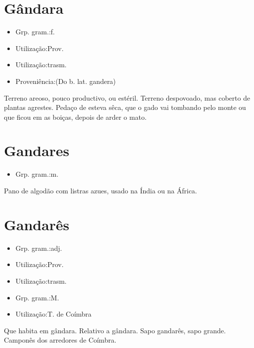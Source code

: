 \section{Gândara}
\begin{itemize}
\item {Grp. gram.:f.}
\end{itemize}
\begin{itemize}
\item {Utilização:Prov.}
\end{itemize}
\begin{itemize}
\item {Utilização:trasm.}
\end{itemize}
\begin{itemize}
\item {Proveniência:(Do b. lat. \textunderscore gandera\textunderscore )}
\end{itemize}
Terreno areoso, pouco productivo, ou estéril.
Terreno despovoado, mas coberto de plantas agrestes.
Pedaço de esteva sêca, que o gado vai tombando pelo monte ou que ficou em as boiças, depois de arder o mato.
\section{Gandares}
\begin{itemize}
\item {Grp. gram.:m.}
\end{itemize}
Pano de algodão com listras azues, usado na Índia ou na África.
\section{Gandarês}
\begin{itemize}
\item {Grp. gram.:adj.}
\end{itemize}
\begin{itemize}
\item {Utilização:Prov.}
\end{itemize}
\begin{itemize}
\item {Utilização:trasm.}
\end{itemize}
\begin{itemize}
\item {Grp. gram.:M.}
\end{itemize}
\begin{itemize}
\item {Utilização:T. de Coímbra}
\end{itemize}
Que habita em gândara.
Relativo a gândara.
\textunderscore Sapo gandarês\textunderscore , sapo grande.
Camponês dos arredores de Coímbra.
